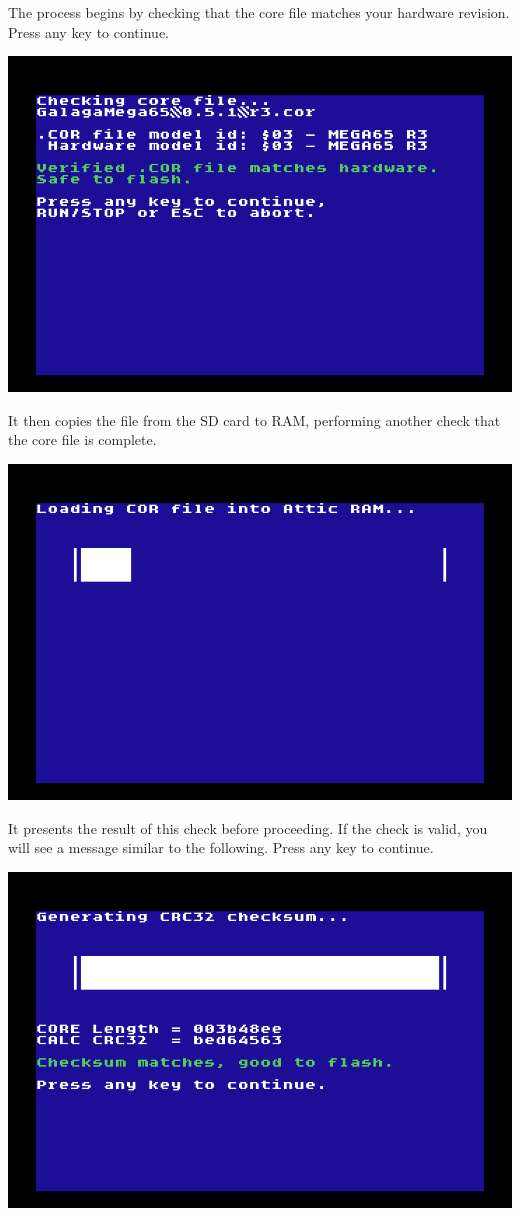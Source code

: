 The process begins by checking that the core file matches your hardware revision. Press any key to continue.

\begin{center}
  \includegraphics[width=0.7\linewidth]{images/ss-flashmenu-1-checking.png}
\end{center}

It then copies the file from the SD card to RAM, performing another check that the core file is complete.

\begin{center}
  \includegraphics[width=0.7\linewidth]{images/ss-flashmenu-2-loading.png}
\end{center}

It presents the result of this check before proceeding. If the check is valid, you will see a message similar to the following. Press any key to continue.

\begin{center}
  \includegraphics[width=0.7\linewidth]{images/ss-flashmenu-3-checksum-ok.png}
\end{center}

